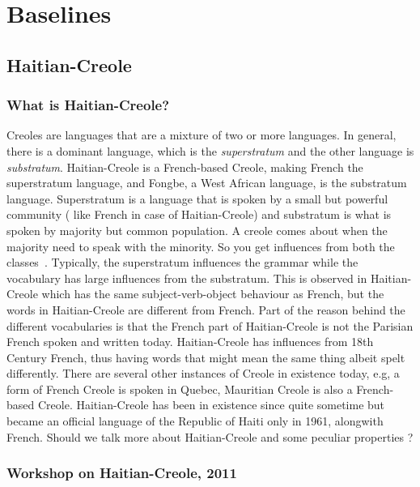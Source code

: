 %
%

\chapter{Baselines}
\label{chap:baselines}

\section{Haitian-Creole}

\subsection{What is Haitian-Creole?}
	
	Creoles are languages that are a mixture of two or more languages. In general, there is a dominant language, which is the \emph{superstratum} and the other language is \emph{substratum}. Haitian-Creole is a French-based Creole, making French the superstratum language, and Fongbe, a West African language, is the substratum language. Superstratum is a language that is spoken by a small but powerful community ( like French in case of Haitian-Creole) and substratum is what is spoken by majority but common population. A creole comes about when the majority need to speak with the minority. So you get influences from both the classes~\cite{Claire:98}. Typically, the superstratum influences the grammar while the vocabulary has large influences from the substratum. This is observed in Haitian-Creole which has the same subject-verb-object behaviour as French, but the words in Haitian-Creole are different from French. Part of the reason behind the different vocabularies is that the French part of Haitian-Creole is not the Parisian French spoken and written today. Haitian-Creole has influences from 18th Century French, thus having words that might mean the same thing albeit spelt differently. There are several other instances of Creole in existence today, e.g, a form of French Creole is spoken in Quebec, Mauritian Creole is also a French-based Creole. Haitian-Creole has been in existence since quite sometime but became an official language of the Republic of Haiti only in 1961, alongwith French. \alert{Should we talk more about Haitian-Creole and some peculiar properties ? }


\subsection{Workshop on Haitian-Creole, 2011}
\label{sec:earthquake}

